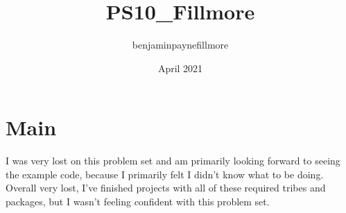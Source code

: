 \documentclass{article}
\title{PS10_Fillmore}
\author{benjaminpaynefillmore }
\date{April 2021}
\begin{document}
\maketitle

\section{Main}
I was very lost on this problem set and am primarily looking forward to seeing the example code, because I primarily felt I didn't know what to be doing. Overall very lost, I've finished projects with all of these required tribes and packages, but I wasn't feeling confident with this problem set. 
\end{document}
